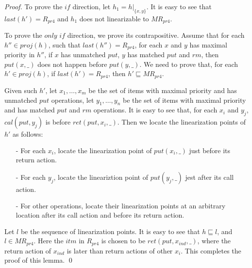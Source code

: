 \begin {proof}

To prove the $\textit{if}$ direction, let $h_1 = h \vert_{ \{ x,y \} }$. It is easy to see that $\textit{last}(h') = R_{\textit{pr4}}$ and $h_1$ does not linearizable to $\textit{MR}_{\textit{pr4}}$.

To prove the $\textit{only if}$ direction, we prove its contrapositive. Assume that for each $h'' \in \textit{proj}(h)$, such that $\textit{last}(h'') = R_{\textit{pr4}}$, for each $x$ and $y$ has maximal priority in $h''$, if $x$ has unmatched $\textit{put}$, $y$ has matched $\textit{put}$ and $\textit{rm}$, then $\textit{put}(x,\_)$ does not happen before $\textit{put}(y,\_)$. We need to prove that, for each $h' \in \textit{proj}(h)$, if $\textit{last}(h') = R_{\textit{pr4}}$, then $h' \sqsubseteq \textit{MR}_{\textit{pr4}}$.

Given such $h'$, let $x_1,\ldots,x_m$ be the set of items with maximal priority and has unmatched $\textit{put}$ operations, let $y_1,\ldots,y_n$ be the set of items with maximal priority and has matched $\textit{put}$ and $\textit{rm}$ operations. It is easy to see that, for each $x_i$ and $y_j$, $\textit{cal}(\textit{put},y_j)$ is before $\textit{ret}(\textit{put},x_i,\_)$. Then we locate the linearization points of $h'$ as follows:

\begin{itemize}
\setlength{\itemsep}{0.5pt}
\item[-] For each $x_i$, locate the linearization point of $\textit{put}(x_i,\_)$ just before its return action.

\item[-] For each $y_j$, locate the lineariztion point of $\textit{put}(y_j,\_)$ jest after its call action.

\item[-] For other operations, locate their linearization points at an arbitrary location after its call action and before its return action.
\end{itemize}

Let $l$ be the sequence of linearization points. It is easy to see that $h \sqsubseteq l$, and $l \in \textit{MR}_{\textit{pr4}}$. Here the $\textit{itm}$ in $R_{\textit{pr4}}$ is chosen to be $\textit{ret}(\textit{put},x_{\textit{ind}},\_)$, where the return action of $x_{\textit{ind}}$ is later than return actions of other $x_i$. This completes the proof of this lemma. \qed
\end {proof}


